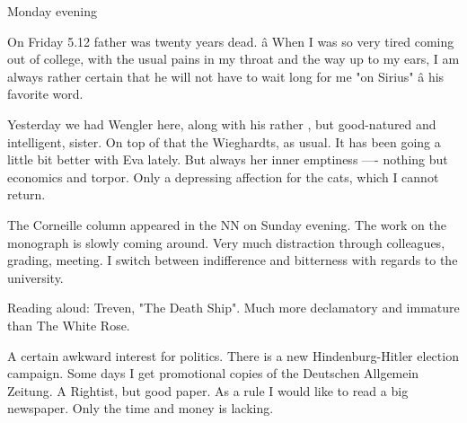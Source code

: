 Monday evening

On Friday 5.12 father was twenty years dead. â When I was so very tired coming out of college, with the usual pains in my throat and the way up to my ears, I am always rather certain that he will not have to wait long for me "on Sirius" â his favorite word.

\missing

Yesterday we had Wengler here, along with his rather , but good-natured and intelligent, sister. On top of that the Wieghardts, as usual. It has been going a little bit better with Eva lately. But always her inner emptiness —- nothing but economics and torpor. Only a depressing affection for the cats, which I cannot return. 

The Corneille column appeared in the NN on Sunday evening. The work on the monograph is slowly coming around. Very much distraction through colleagues, grading, meeting. I switch between indifference and bitterness with regards to the university.

Reading aloud: Treven, "The Death Ship". Much more declamatory and immature than The White Rose.

A certain awkward interest for politics. There is a new Hindenburg-Hitler election campaign. Some days I get promotional copies of the Deutschen Allgemein Zeitung. A Rightist, but good paper. As a rule I would like to read a big newspaper. Only the time and money is lacking.

